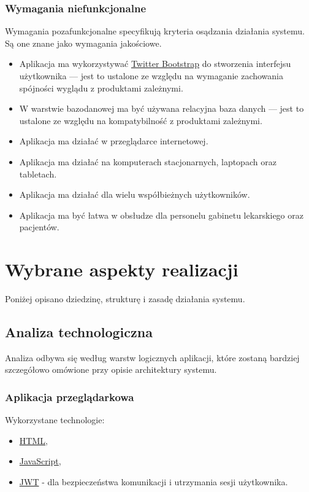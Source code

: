 \documentclass[polish,12pt]{aghthesis}
\begin{document}
\subsubsection{Wymagania niefunkcjonalne}
Wymagania pozafunkcjonalne specyfikują kryteria osądzania działania systemu. Są one znane jako wymagania jakościowe.
\begin{itemize}
    \item Aplikacja ma wykorzystywać \href{https://getbootstrap.com/}{Twitter Bootstrap} do stworzenia interfejsu użytkownika --- jest to ustalone ze względu na wymaganie zachowania spójności wyglądu z produktami zależnymi.
    \item W warstwie bazodanowej ma być używana relacyjna baza danych --- jest to ustalone ze względu na kompatybilność z produktami zależnymi.
    \item Aplikacja ma działać w przeglądarce internetowej.
    \item Aplikacja ma działać na komputerach stacjonarnych, laptopach oraz tabletach.
    \item Aplikacja ma działać dla wielu współbieżnych użytkowników.
    \item Aplikacja ma być łatwa w obsłudze dla personelu gabinetu lekarskiego oraz pacjentów.
\end{itemize}


\section{Wybrane aspekty realizacji}
\label{sec:wybrane-aspekty-realizacji}

Poniżej opisano dziedzinę, strukturę i zasadę działania systemu.

\subsection{Analiza technologiczna}
\label{subsec:analizaTechnologiczna}
Analiza odbywa się według warstw logicznych aplikacji, które zostaną bardziej szczegółowo omówione przy opisie architektury systemu.

\subsubsection{Aplikacja przeglądarkowa}
Wykorzystane technologie:
\begin{itemize}
  \item \href{https://pl.wikipedia.org/wiki/HTML}{HTML},
  \item \href{https://pl.wikipedia.org/wiki/JavaScript}{JavaScript},
  \item \href{https://jwt.io/}{JWT} - dla bezpieczeństwa komunikacji i utrzymania sesji użytkownika.
\end{itemize}
\end{document}
